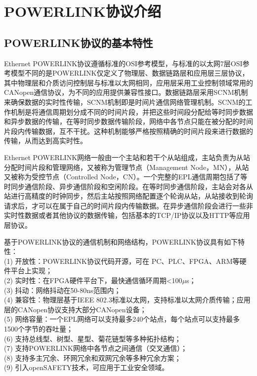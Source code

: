 \section{POWERLINK协议介绍}

\subsection{POWERLINK协议的基本特性}

Ethernet POWERLINK协议遵循标准的OSI参考模型，与标准的以太网7层OSI参考模型不同的是POWERLINK仅定义了物理层、数据链路层和应用层三层协议，其中物理层和介质访问控制层与标准以太网相同，应用层采用工业控制领域常用的CANopen通信协议，为不同的应用提供兼容性接口。数据链路层采用SCNM机制来确保数据的实时性传输，SCNM机制即是时间片通信网络管理机制。SCNM的工作机制是将通信周期划分成不同的时间片段，并把这些时间段分配给等时同步数据和异步数据的传输，在等时同步数据传输阶段，网络中各节点只能在被分配的时间片段内传输数据，互不干扰。这种机制能够严格按照精确的时间片段来进行数据的传输，从而达到高实时性\cite{powerlink}。

Ethernet POWERLINK网络一般由一个主站和若干个从站组成，主站负责为从站分配时间片段和管理网络，又被称为管理节点（Management Node，MN），从站又被称为受控节点（Controlled Node，CN）。一个完整的EPL通信周期包括了等时同步通信阶段、异步通信阶段和空闲阶段。在等时同步通信阶段，主站会对各从站进行高精度的时钟同步，然后主站按照网络配置逐个轮询从站，从站接收到轮询请求后，才可以在属于自己的时间片段内传输数据。在异步通信阶段会进行一些非实时性数据或者其他协议的数据传输，包括基本的TCP/IP协议以及HTTP等应用层协议\cite{powerlink}。

基于POWERLINK协议的通信机制和网络结构，POWERLINK协议具有如下特性\cite{ESPG}：\\
(1) 开放性：POWERLINK协议代码开源，可在 PC、PLC、FPGA、ARM等硬件平台上实现；\\
(2) 实时性：在FPGA硬件平台下，最快通信循环周期<100$\mu$s；\\
(3) 抖动：网络抖动在50-80ns范围内；\\
(4) 兼容性：物理层基于IEEE 802.3标准以太网，支持标准以太网介质传输；应用层的CANopen协议支持大部分CANopen设备；\\
(5) 网络容量：一个EPL网络可以支持最多240个站点，每个站点可以支持最多1500个字节的吞吐量；\\
(6) 支持总线型、树型、星型、菊花链型等多种拓扑结构；\\
(7) 支持POWERLINK网络中各节点之间通信（交叉通信）；\\
(8) 支持多主冗余、环网冗余和双网冗余等多种冗余方案；\\
(9) 引入openSAFETY技术，可应用于工业安全领域。

